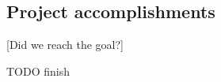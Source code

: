 \subsection{Project accomplishments}\label{Project accomplishments}
    [Did we reach the goal?]
    
    TODO finish
